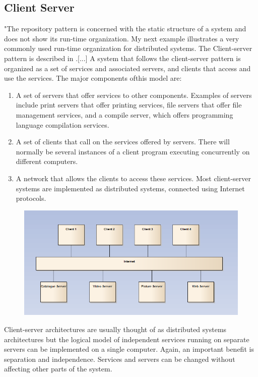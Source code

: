 \subsection{Client Server}
"The repository pattern is concerned with the static structure of a system and does not show its run-time organization. My next example illustrates a very commonly used run-time organization for distributed systems. The Client-server pattern is described in .[...]
A system that follows the client-server pattern is organized as a set of services and associated servers, and clients that access and use the services. The major components ofthis model are:
\begin{enumerate}
\item A set of servers that offer services to other components. Examples of servers include print servers that offer printing services, file servers that offer file management services, and a compile server, which offers programming language compilation services.
\item A set of clients that call on the services offered by servers. There will normally be several instances of a client program executing concurrently on different computers.
\item A network that allows the clients to access these services. Most client-server systems are implemented as distributed systems, connected using Internet protocols.
\end{enumerate}
\begin{figure}[!hbp]
\includegraphics[scale=0.85]{img/pics/Client_Server.PNG}
\caption{ \protect \cite{sommerville}}
\label{fig:ref_cs}
\end{figure}
Client-server architectures are usually thought of as distributed systems architectures but the logical model of independent services running on separate servers can be implemented on a single computer. Again, an important benefit is separation and independence. Services and servers can be changed without affecting other parts of the system.
